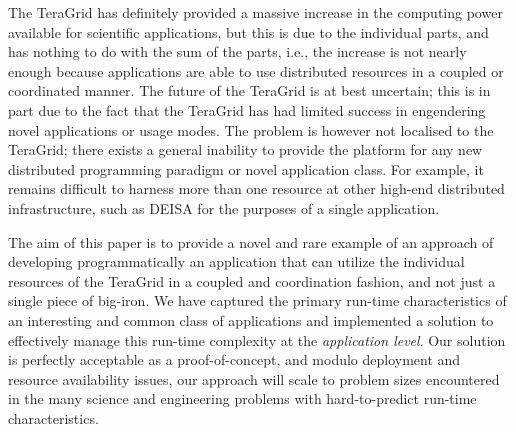 \documentclass[conference,final]{IEEEtran}
\begin{document}
The TeraGrid has definitely provided a massive increase in the
computing power available for scientific applications, but this is due
to the individual parts, and has nothing to do with the sum of the
parts, i.e., the increase is not nearly enough because applications
are able to use distributed resources in a coupled or coordinated
manner.  The future of the TeraGrid \cite{teragridfuture} is at best
uncertain; this is in part due to the fact that the TeraGrid has had
limited success in engendering novel applications or usage modes.  The
problem is however not localised to the TeraGrid; there exists a
general inability to provide the platform for any new distributed
programming paradigm or novel application class.  For example, it
remains difficult to harness more than one resource at other high-end
distributed infrastructure, such as DEISA for the purposes of a single
application.

The aim of this paper is to provide a novel and rare example of an
approach of developing programmatically an application that can
utilize the individual resources of the TeraGrid in a coupled and
coordination fashion, and not just a single piece of big-iron.  We
have captured the primary run-time characteristics of an interesting
and common class of applications and implemented a solution to
effectively manage this run-time complexity at the {\it application
  level}.  Our solution is perfectly acceptable as a proof-of-concept,
and modulo deployment and resource availability issues, our approach
will scale to problem sizes encountered in the many science and
engineering problems with hard-to-predict run-time characteristics.



\end{document}
